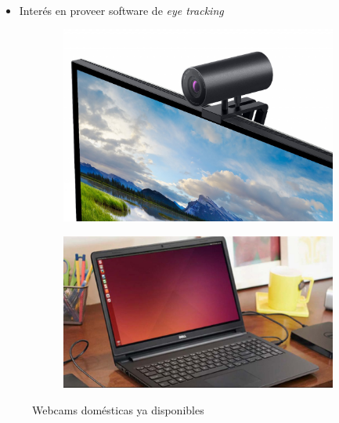 \documentclass[aspectratio=169]{beamer}
\begin{document}
\begin{frame}{~}

  \begin{itemize}
    \item Interés en proveer software de \textit{eye tracking}
  \end{itemize}

  \begin{figure}
    \begin{subfigure}{0.49\textwidth}
      \centering
      \includegraphics[width=0.6\linewidth]{img/external-webcam.jpg}
    \end{subfigure}
    \begin{subfigure}{0.49\textwidth}
      \centering
      \includegraphics[width=0.6\linewidth]{img/notebook.jpg}
    \end{subfigure}
    \caption{Webcams domésticas ya disponibles}
  \end{figure}


\end{frame}
\end{document}
